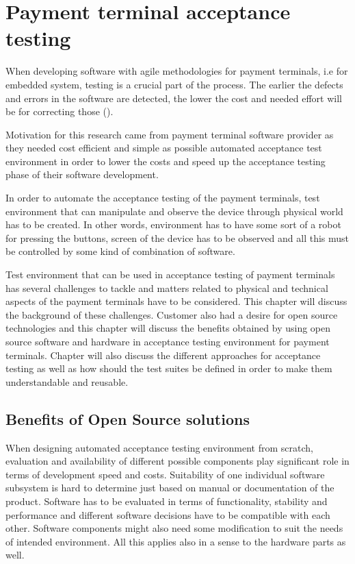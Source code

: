 
\chapter{Payment terminal acceptance testing}
\label{chapter:Payment terminal acceptance testing} 

When developing software with agile methodologies for payment terminals, i.e for embedded system, testing is a crucial part of the process. The earlier the defects and errors in the software are detected, the lower the cost and needed effort will be for correcting those (\emph{\cite{myers2011art}}).

Motivation for this research came from payment terminal software provider as they needed cost efficient and simple as possible automated acceptance test environment in order to lower the costs and speed up the acceptance testing phase of their software development.

In order to automate the acceptance testing of the payment terminals, test environment that can manipulate and observe the device through physical world has to be created. In other words, environment has to have some sort of a robot for pressing the buttons, screen of the device has to be observed and all this must be controlled by some kind of combination of software.

Test environment that can be used in acceptance testing of payment terminals has several challenges to tackle and matters related to physical and technical aspects of the payment terminals have to be considered. This chapter will discuss the background of these challenges. Customer also had a desire for open source technologies and this chapter will discuss the benefits obtained by using open source software and hardware in acceptance testing environment for payment terminals. Chapter will also discuss the different approaches for acceptance testing as well as how should the test suites be defined in order to make them understandable and reusable.

\section{Benefits of Open Source solutions}
\label{section:Open source}

When designing automated acceptance testing environment from scratch, evaluation and availability of different possible components play significant role in terms of development speed and costs. Suitability of one individual software subsystem is hard to determine just based on manual or documentation of the product. Software has to be evaluated in terms of functionality, stability and performance and different software decisions have to be compatible with each other. Software components might also need some modification to suit the needs of intended environment. All this applies also in a sense to the hardware parts as well.

